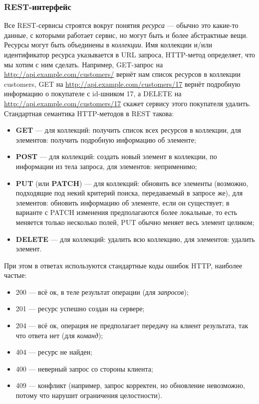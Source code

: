 \documentclass[a5paper]{article}
\begin{document}
\subsubsection{REST-интерфейс}

Все REST-сервисы строятся вокруг понятия \emph{ресурса} --- обычно это какие-то данные, с которыми работает сервис, но могут быть и более абстрактные вещи. Ресурсы могут быть объединены в \emph{коллекции}. Имя коллекции и/или идентификатор ресурса указывается в URL запроса, HTTP-метод определяет, что мы хотим с ним сделать. Например, GET-запрос на \url{http://api.example.com/customers/} вернёт нам список ресурсов в коллекции customers, GET на \url{http://api.example.com/customers/17} вернёт подробную информацию о покупателе с id-шником 17, а DELETE на \url{http://api.example.com/customers/17} скажет сервису этого покупателя удалить. Стандартная семантика HTTP-методов в REST такова:

\begin{itemize}
    \item \textbf{GET} --- для коллекций: получить список всех ресурсов в коллекции, для элементов: получить подробную информацию об элементе;
    \item \textbf{POST} --- для коллекций: создать новый элемент в коллекции, по информации из тела запроса, для элементов: неприменимо;
    \item \textbf{PUT} (или \textbf{PATCH}) --- для коллекций: обновить все элементы (возможно, подходящие под некий критерий поиска, передаваемый в запросе же), для элементов: обновить информацию об элементе, если он существует; в варианте с PATCH изменения предполагаются более локальные, то есть меняется только несколько полей, PUT обычно меняет весь элемент целиком;
    \item \textbf{DELETE} --- для коллекций: удалить всю коллекцию, для элементов: удалить элемент.
\end{itemize}

При этом в ответах используются стандартные коды ошибок HTTP, наиболее частые:

\begin{itemize}
    \item 200 --- всё ок, в теле результат операции (для \emph{запросов});
    \item 201 --- ресурс успешно создан на сервере;
    \item 204 --- всё ок, операция не предполагает передачу на клиент результата, так что ответа нет (для \emph{команд});
    \item 404 --- ресурс не найден;
    \item 400 --- неверный запрос со стороны клиента;
    \item 409 --- конфликт (например, запрос корректен, но обновление невозможно, потому что нарушит ограничения целостности).
\end{itemize}
\end{document}
